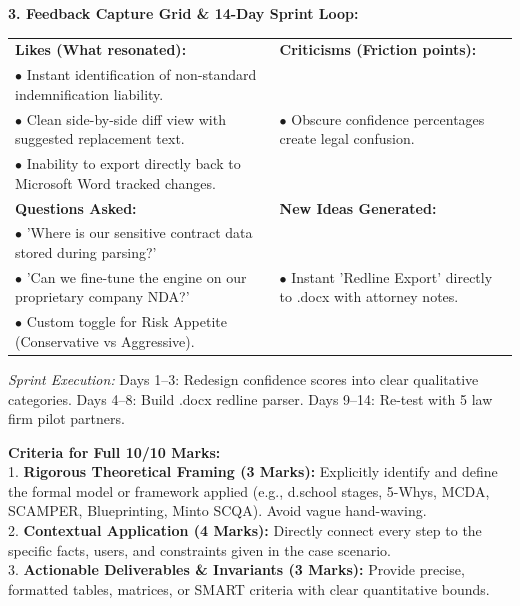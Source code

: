 \begin{solbox}
\textbf{3. Feedback Capture Grid \& 14-Day Sprint Loop:}\\
\begin{tabularx}{\linewidth}{|X|X|} \hline
\textbf{Likes (What resonated):} & \textbf{Criticisms (Friction points):} \\
$\bullet$ Instant identification of non-standard indemnification liability.\\
$\bullet$ Clean side-by-side diff view with suggested replacement text. &
$\bullet$ Obscure confidence percentages create legal confusion.\\
$\bullet$ Inability to export directly back to Microsoft Word tracked changes. \\ \hline
\textbf{Questions Asked:} & \textbf{New Ideas Generated:} \\
$\bullet$ 'Where is our sensitive contract data stored during parsing?'\\
$\bullet$ 'Can we fine-tune the engine on our proprietary company NDA?' &
$\bullet$ Instant 'Redline Export' directly to .docx with attorney notes.\\
$\bullet$ Custom toggle for Risk Appetite (Conservative vs Aggressive). \\ \hline
\end{tabularx}

\textit{Sprint Execution:} Days 1--3: Redesign confidence scores into clear qualitative categories. Days 4--8: Build .docx redline parser. Days 9--14: Re-test with 5 law firm pilot partners.
\end{solbox}

\begin{examinertip}
\textbf{Criteria for Full 10/10 Marks:}\\
1. \textbf{Rigorous Theoretical Framing (3 Marks):} Explicitly identify and define the formal model or framework applied (e.g., d.school stages, 5-Whys, MCDA, SCAMPER, Blueprinting, Minto SCQA). Avoid vague hand-waving.\\
2. \textbf{Contextual Application (4 Marks):} Directly connect every step to the specific facts, users, and constraints given in the case scenario.\\
3. \textbf{Actionable Deliverables \& Invariants (3 Marks):} Provide precise, formatted tables, matrices, or SMART criteria with clear quantitative bounds.
\end{examinertip}
